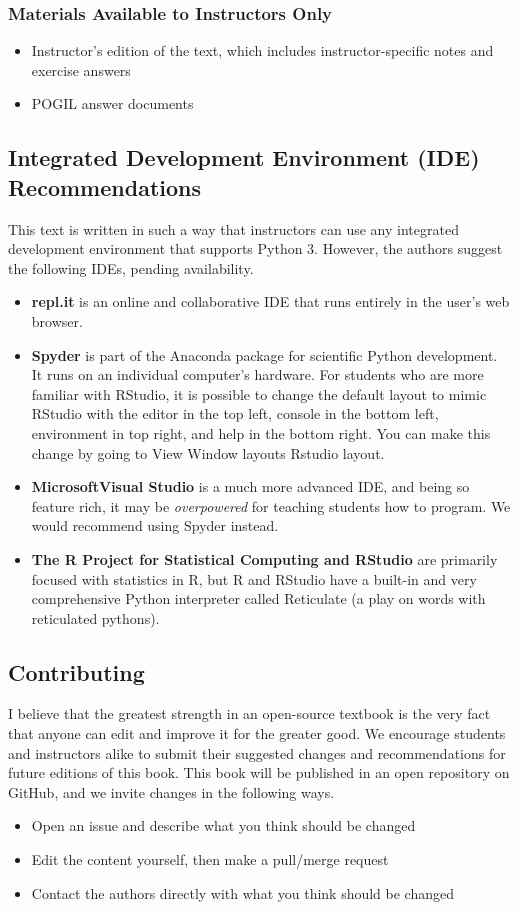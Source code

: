 \subsubsection*{Materials Available to Instructors Only}
\begin{itemize}
    \item {Instructor's edition of the text, which includes instructor-specific notes and exercise answers}
    \item {POGIL answer documents}
\end{itemize}
\subsection*{Integrated Development Environment (IDE) Recommendations}
This text is written in such a way that instructors can use any integrated development environment that supports Python 3. However, the authors suggest the following IDEs, pending availability.
\begin{itemize}
    \item {\textbf{repl.it\textregistered} is an online and collaborative IDE that runs entirely in the user's web browser.}
    \item {\textbf{Spyder} is part of the Anaconda package for scientific Python development. It runs on an individual computer's hardware. For students who are more familiar with RStudio, it is possible to change the default layout to mimic RStudio with the editor in the top left, console in the bottom left, environment in top right, and help in the bottom right. You can make this change by going to View \textrangle{} Window layouts \textrangle{} Rstudio layout.}
    \item {\textbf{Microsoft\textregistered Visual Studio} is a much more advanced IDE, and being so feature rich, it may be \textit{overpowered} for teaching students how to program. We would recommend using Spyder instead.}
    \item {\textbf{The R Project for Statistical Computing and RStudio} are primarily focused with statistics in R, but R and RStudio have a built-in and very comprehensive Python interpreter called Reticulate (a play on words with reticulated pythons).}
\end{itemize}
\subsection*{Contributing}
I believe that the greatest strength in an open-source textbook is the very fact that anyone can edit and improve it for the greater good. We encourage students and instructors alike to submit their suggested changes and recommendations for future editions of this book. This book will be published in an open repository on GitHub, and we invite changes in the following ways.
\begin{itemize}
    \item {Open an issue and describe what you think should be changed}
    \item {Edit the content yourself, then make a pull/merge request}
    \item {Contact the authors directly with what you think should be changed}
\end{itemize}
